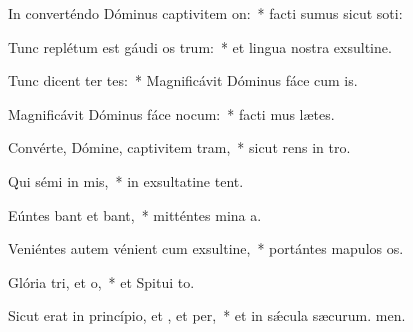 \item In converténdo Dóminus captivitem on:~* facti sumus sicut soti:
\item Tunc replétum est gáudi os trum:~* et lingua nostra exsultine.
\item Tunc dicent ter tes:~* Magnificávit Dóminus fáce cum is.
\item Magnificávit Dóminus fáce nocum:~* facti mus lætes.
\item Convérte, Dómine, captivitem tram,~* sicut rens in tro.
\item Qui sémi in mis,~* in exsultatine tent.
\item Eúntes bant et bant,~* mitténtes mina a.
\item Veniéntes autem vénient cum exsultine,~* portántes mapulos os.
\item Glória tri, et o,~* et Spitui to.
\item Sicut erat in princípio, et , et per,~* et in sǽcula sæcurum. men.
